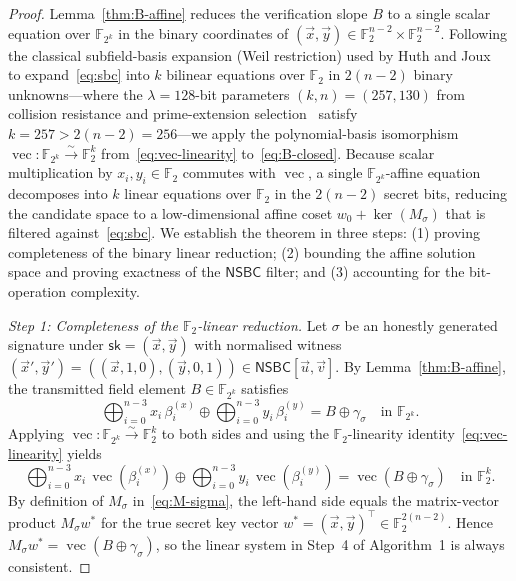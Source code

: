 \documentclass[11pt,a4paper]{article}
\theoremstyle{definition}
\theoremstyle{remark}
\newcommand{\Ftwo}{\mathbb{F}_2}
\newcommand{\Ftwok}{\mathbb{F}_{2^k}}
\newcommand{\NSBC}{\mathsf{NSBC}}
\newcommand{\sk}{\mathsf{sk}}
\newcommand{\vecF}{\operatorname{vec}}
\begin{document}
\begin{proof}
Lemma~\ref{thm:B-affine} reduces the verification slope $B$ to a single scalar equation over $\Ftwok$ in the binary coordinates of $(\vec{x}, \vec{y}) \in \Ftwo^{n-2} \times \Ftwo^{n-2}$. Following the classical subfield-basis expansion (Weil restriction) used by Huth and Joux~\cite[Section~2.2]{HJ24} to expand~\eqref{eq:sbc} into $k$ bilinear equations over $\Ftwo$ in $2(n-2)$ binary unknowns---where the $\lambda = 128$-bit parameters $(k, n) = (257, 130)$ from collision resistance and prime-extension selection~\cite[Sections~2.2 and~4.1]{HJ24} satisfy $k = 257 > 2(n-2) = 256$---we apply the polynomial-basis isomorphism $\vecF : \Ftwok \xrightarrow{\sim} \Ftwo^k$ from~\eqref{eq:vec-linearity} to~\eqref{eq:B-closed}. Because scalar multiplication by $x_i, y_i \in \Ftwo$ commutes with $\vecF$, a single $\Ftwok$-affine equation decomposes into $k$ linear equations over $\Ftwo$ in the $2(n-2)$ secret bits, reducing the candidate space to a low-dimensional affine coset $w_0 + \ker(M_\sigma)$ that is filtered against~\eqref{eq:sbc}. We establish the theorem in three steps: (1) proving completeness of the binary linear reduction; (2) bounding the affine solution space and proving exactness of the $\NSBC$ filter; and (3) accounting for the bit-operation complexity.

\smallskip\noindent
\emph{Step 1: Completeness of the $\Ftwo$-linear reduction.}
Let $\sigma$ be an honestly generated signature under $\sk = (\vec{x}, \vec{y})$ with normalised witness $(\vec{x}', \vec{y}') = ((\vec{x}, 1, 0), (\vec{y}, 0, 1)) \in \NSBC[\vec{u}, \vec{v}]$. By Lemma~\ref{thm:B-affine}, the transmitted field element $B \in \Ftwok$ satisfies
\[
\bigoplus_{i=0}^{n-3} x_i \, \beta_i^{(x)} \oplus \bigoplus_{i=0}^{n-3} y_i \, \beta_i^{(y)} = B \oplus \gamma_\sigma \quad \text{in } \Ftwok.
\]
Applying $\vecF : \Ftwok \xrightarrow{\sim} \Ftwo^k$ to both sides and using the $\Ftwo$-linearity identity~\eqref{eq:vec-linearity} yields
\[
\bigoplus_{i=0}^{n-3} x_i \, \vecF(\beta_i^{(x)}) \oplus \bigoplus_{i=0}^{n-3} y_i \, \vecF(\beta_i^{(y)}) = \vecF(B \oplus \gamma_\sigma) \quad \text{in } \Ftwo^k.
\]
By definition of $M_\sigma$ in~\eqref{eq:M-sigma}, the left-hand side equals the matrix-vector product $M_\sigma w^*$ for the true secret key vector $w^* = (\vec{x}, \vec{y})^\top \in \Ftwo^{2(n-2)}$. Hence $M_\sigma w^* = \vecF(B \oplus \gamma_\sigma)$, so the linear system in Step~4 of Algorithm~1 is always consistent.


\end{proof}
\end{document}
